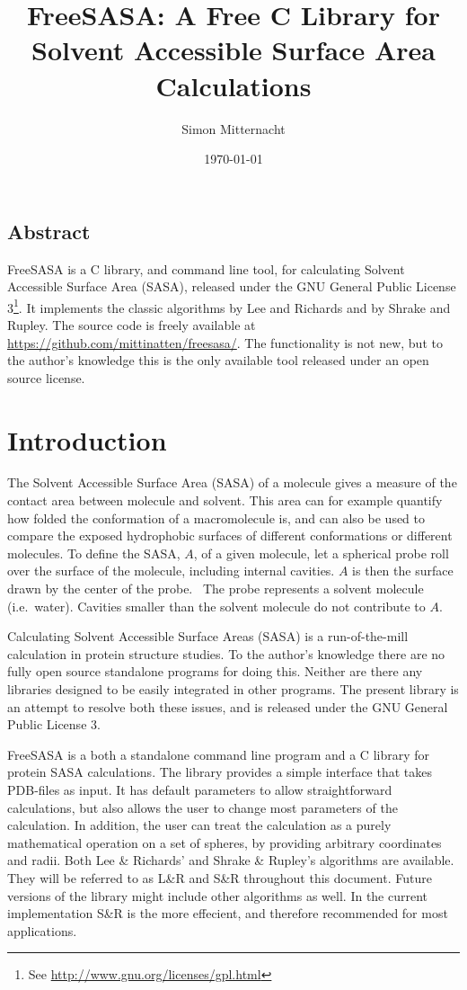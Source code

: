 \documentclass[a4paper,11pt]{article}
\author{Simon Mitternacht}
\date{\today}
\title{FreeSASA: A Free C Library for Solvent Accessible Surface
  Area Calculations}
\begin{document}
\maketitle

\subsection*{Abstract}
FreeSASA is a C library, and command line tool, for calculating
Solvent Accessible Surface Area (SASA), released under the GNU General
Public License 3\footnote{See
  \url{http://www.gnu.org/licenses/gpl.html}}. It implements the
classic algorithms by Lee and Richards and by Shrake and Rupley. The
source code is freely available at
\url{https://github.com/mittinatten/freesasa/}.  The functionality is
not new, but to the author's knowledge this is the only available tool
released under an open source license.

\section{Introduction}
The Solvent Accessible Surface Area (SASA) of a molecule gives a
measure of the contact area between molecule and solvent. This
area can for example quantify how folded the conformation of a
macromolecule is, and can also be used to compare the exposed
hydrophobic surfaces of different conformations or different
molecules. To define the SASA, $A$, of a given molecule, let a
spherical probe roll over the surface of the molecule, including
internal cavities. $A$ is then the surface drawn by the center of the
probe.~\cite{LnR} The probe represents a solvent molecule
(i.e.\ water). Cavities smaller than the solvent molecule do not
contribute to $A$.

Calculating Solvent Accessible Surface Areas (SASA) is a
run-of-the-mill calculation in protein structure studies. To the
author's knowledge there are no fully open source standalone programs
for doing this. Neither are there any libraries designed to be easily
integrated in other programs. The present library is an attempt to
resolve both these issues, and is released under the GNU General
Public License 3.

FreeSASA is a both a standalone command line program and a C library
for protein SASA calculations. The library provides a simple interface
that takes PDB-files as input. It has default parameters to allow
straightforward calculations, but also allows the user to change most
parameters of the calculation. In addition, the user can treat the
calculation as a purely mathematical operation on a set of spheres, by
providing arbitrary coordinates and radii. Both Lee \& Richards'
\cite{LnR} and Shrake \& Rupley's \cite{SnR} algorithms are
available. They will be referred to as L\&R and S\&R throughout this
document. Future versions of the library might include other
algorithms as well. In the current implementation S\&R is the more
effecient, and therefore recommended for most applications.
\end{document}

